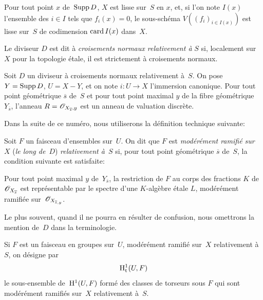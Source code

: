 \setcounter{subsubsection}{-1}
\subsubsection{}
\label{XIII.2.1.0}
Pour tout point $x$ de~$\operatorname{Supp} D$, $X$ est lisse sur~$S$ en $x$, et, si
l'on note $I(x)$ l'ensemble des $i\in I$ tels que $f_i(x)=0$, le
sous-sch\'ema $V((f_i)_{i\in I(x)})$ est lisse sur~$S$ de
codimension
$\operatorname{card} I(x)$
dans~$X$.

Le diviseur $D$ est dit \`a \emph{croisements normaux relativement
à} $S$ si, localement sur~$X$ pour la topologie \'etale, il est
strictement \`a croisements normaux.

Soit $D$ un diviseur \`a croisements normaux relativement
\`a~$S$. On pose $Y=\operatorname{Supp} D$, $U=X-Y$, et on note $i\colon U\to X$
l'immersion canonique. Pour tout point g\'eom\'etrique
$\overline{s}$ de~$S$ et pour tout point maximal $y$ de la fibre
g\'eom\'etrique $Y_{\overline{s}}$, l'anneau
$R=\cal{O}_{X_{\overline{s}},y}$ est un anneau de valuation
discr\`ete.

Dans la suite de ce num\'ero, nous utiliserons la d\'efinition
technique suivante:

\begin{subdefinition}
\label{XIII.2.1.1}
Soit $F$ un faisceau d'ensembles sur~$U$. On dit que $F$ est
\emph{modérément ramifié sur}~$X$
(\emph{le long de}~$D$) \emph{relativement à}~$S$ si, pour tout
point g\'eom\'etrique $\overline{s}$ de~$S$, la condition suivante
est satisfaite:

Pour tout point maximal $y$ de~$Y_{\overline{s}}$, la restriction de
$F$ au corps des fractions $K$ de~$\cal{O}_{X_{\overline{s}}}$ est
repr\'esentable par le spectre d'une $K$-alg\`ebre \'etale $L$,
mod\'er\'ement ramifi\'ee sur~$\cal{O}_{X_{\overline{s},y}}$.
\end{subdefinition}

Le plus souvent, quand il ne pourra en r\'esulter de confusion, nous
omettrons la mention de~$D$ dans la terminologie.

\begin{subdefinition}
\label{XIII.2.1.2}
Si
$F$ est un faisceau en groupes sur~$U$, mod\'er\'ement
ramifi\'e sur~$X$ relativement \`a~$S$, on d\'esigne par
$$
\mathrm{H}^1_{\mathrm{t}}(U,F)
$$
\label{indnot:mc}le sous-ensemble de~$\mathrm{H}^1(U,F)$ form\'e des classes de torseurs sous
$F$ qui sont mod\'er\'ement ramifi\'es sur~$X$ relativement
\`a~$S$.
\end{subdefinition}

